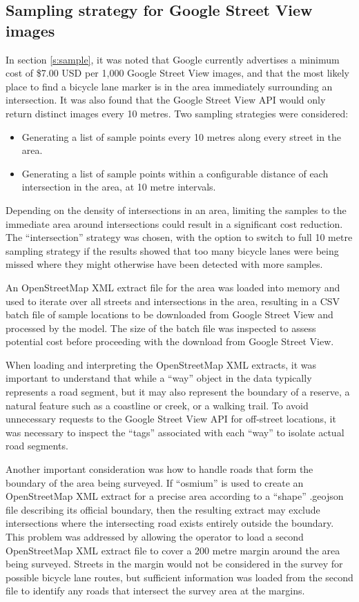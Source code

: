\documentclass[11pt,twoside]{report}
\begin{document}
\subsection{Sampling strategy for Google Street View images}
\label{s:rq2a}

In section \ref{s:sample}, it was noted that Google currently advertises a minimum cost of \$7.00 USD per 1,000 Google Street View images, and that the most likely place to find a bicycle lane marker is in the area immediately surrounding an intersection.  It was also found that the Google Street View API would only return distinct images every 10 metres.  Two sampling strategies were considered:
\begin{itemize}
\item{Generating a list of sample points every 10 metres along every street in the area.}
\item{Generating a list of sample points within a configurable distance of each intersection in the area, at 10 metre intervals.	}
\end{itemize}

Depending on the density of intersections in an area, limiting the samples to the immediate area around intersections could result in a significant cost reduction.  The ``intersection'' strategy was chosen, with the option to switch to full 10 metre sampling strategy if the results showed that too many bicycle lanes were being missed where they might otherwise have been detected with more samples.

An OpenStreetMap XML extract file for the area was loaded into memory and used to iterate over all streets and intersections in the area, resulting in a CSV batch file of sample locations to be downloaded from Google Street View and processed by the model.  The size of the batch file was inspected to assess potential cost before proceeding with the download from Google Street View.

When loading and interpreting the OpenStreetMap XML extracts, it was important to understand that while a ``way'' object in the data typically represents a road segment, but it may also represent the boundary of a reserve, a natural feature such as a coastline or creek, or a walking trail.  To avoid unnecessary requests to the Google Street View API for off-street locations, it was necessary to inspect the ``tags'' associated with each ``way'' to isolate actual road segments.

Another important consideration was how to handle roads that form the boundary of the area being surveyed.  If ``osmium'' is used to create an OpenStreetMap XML extract for a precise area according to a ``shape'' .geojson file describing its official boundary, then the resulting extract may exclude intersections where the intersecting road exists entirely outside the boundary.  This problem was addressed by allowing the operator to load a second OpenStreetMap XML extract file to cover a 200 metre margin around the area being surveyed.  Streets in the margin would not be considered in the survey for possible bicycle lane routes, but sufficient information was loaded from the second file to identify any roads that intersect the survey area at the margins.
\end{document}
